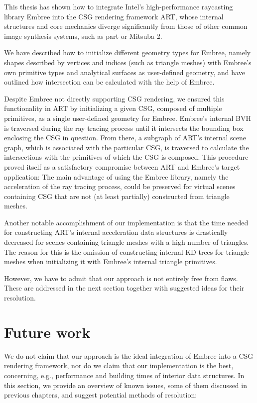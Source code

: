 \label{chap:conclusion}

This thesis has shown how to integrate Intel's high-performance raycasting library Embree into the CSG rendering framework ART, whose internal structures and core mechanics diverge significantly from those of other common image synthesis systems, such as part or Mitsuba 2.

We have described how to initialize different geometry types for Embree, namely shapes described by vertices and indices (such as triangle meshes) with Embree's own primitive types and analytical surfaces as user-defined geometry, and have outlined how intersection can be calculated with the help of Embree. 

Despite Embree not directly supporting CSG rendering, we ensured this functionality in ART by initializing a given CSG, composed of multiple primitives, as a single user-defined geometry for Embree. Embree's internal BVH is traversed during the ray tracing process until it intersects the bounding box enclosing the CSG in question. From there, a subgraph of ART's internal scene graph, which is associated with the particular CSG, is traversed to calculate the intersections with the primitives of which the CSG is composed. This procedure proved itself as a satisfactory compromise between ART and Embree's target application: The main advantage of using the Embree library, namely the acceleration of the ray tracing process, could be preserved for virtual scenes containing CSG that are not (at least partially) constructed from triangle meshes.

Another notable accomplishment of our implementation is that the time needed for constructing ART's internal acceleration data structures is drastically decreased for scenes containing triangle meshes with a high number of triangles. The reason for this is the omission of constructing internal KD trees for triangle meshes when initializing it with Embree's internal triangle primitives. 

However, we have to admit that our approach is not entirely free from flaws. These are addressed in the next section together with suggested ideas for their resolution.  


\section*{Future work}

We do not claim that our approach is the ideal integration of Embree into a CSG rendering framework, nor do we claim that our implementation is the best, concerning, e.g., performance and building times of interior data structures.
In this section, we provide an overview of known issues, some of them discussed in previous chapters, and suggest potential methods of resolution:
\\

